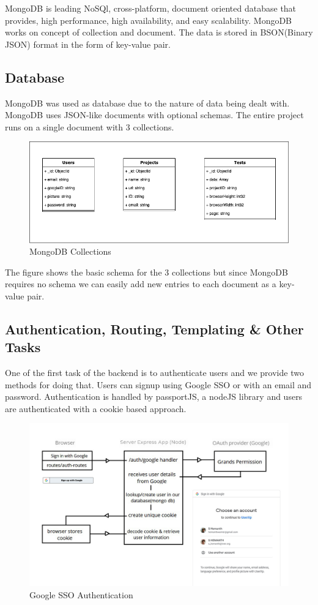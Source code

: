 \documentclass[12pt,a4paper,final]{extreport}
\begin{document}
MongoDB is leading NoSQl, cross-platform, document oriented database that provides, high performance, high availability, and easy scalability. MongoDB works on concept of collection and document. The data is stored in BSON(Binary JSON) format in the form of key-value pair.

\subsection{Database}
MongoDB was used as database due to the nature of data being dealt with. MongoDB uses JSON-like documents with optional schemas. The entire project runs on a single document with 3 collections.

\begin{figure}[H]
    \centering
    \includegraphics[width=\linewidth]{db.png}
    \caption{MongoDB Collections}
\end{figure}
The figure shows the basic schema for the 3 collections but since MongoDB requires no schema we can easily add new entries to each document as a key-value pair.

\subsection{Authentication, Routing, Templating \& Other Tasks}
One of the first task of the backend is to authenticate users and we provide two methods for doing that. Users can signup using Google SSO or with an email and password. Authentication is handled by passportJS, a nodeJS library and users are authenticated with a cookie based approach.

\begin{figure}[H]
    \centering
    \includegraphics[width=\linewidth]{google-sso-auth.png}
    \caption{Google SSO Authentication}
\end{figure}
\end{document}
